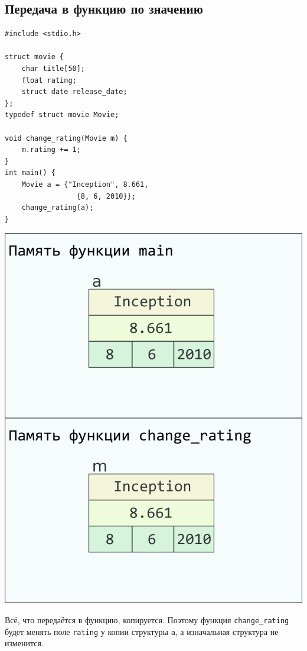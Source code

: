 \documentclass{article}
\begin{document}
\subsection*{Передача в функцию по значению}
\begin{multicols}{2}
\begin{lstlisting}
#include <stdio.h>

struct movie {
	char title[50];
	float rating;
	struct date release_date;
};
typedef struct movie Movie;

void change_rating(Movie m) {
	m.rating += 1;
}
int main() {
	Movie a = {"Inception", 8.661, 
	             {8, 6, 2010}};
	change_rating(a);
}
\end{lstlisting}
\columnbreak
\begin{center}
\includegraphics[scale=1]{../images/pointer_schemes/function_by_value.png}
\end{center}
\end{multicols}
Всё, что передаётся в функцию, копируется. Поэтому функция \texttt{change\_rating} будет менять
поле \texttt{rating} у копии структуры \texttt{a}, а изначальная структура не изменится.
\end{document}
